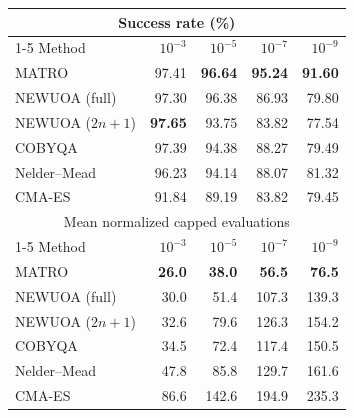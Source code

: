 \begin{tabular}{lrrrr}
\toprule
\multicolumn{5}{c}{Success rate (\%)} \\
\cmidrule(lr){1-5}
Method & $10^{-3}$ & $10^{-5}$ & $10^{-7}$ & $10^{-9}$ \\
\midrule
MATRO & 97.41 & \textbf{96.64} & \textbf{95.24} & \textbf{91.60} \\
NEWUOA (full) & 97.30 & 96.38 & 86.93 & 79.80 \\
NEWUOA ($2n+1$) & \textbf{97.65} & 93.75 & 83.82 & 77.54 \\
COBYQA & 97.39 & 94.38 & 88.27 & 79.49 \\
Nelder--Mead & 96.23 & 94.14 & 88.07 & 81.32 \\
CMA-ES & 91.84 & 89.19 & 83.82 & 79.45 \\
\midrule
\multicolumn{5}{c}{Mean normalized capped evaluations} \\
\cmidrule(lr){1-5}
Method & $10^{-3}$ & $10^{-5}$ & $10^{-7}$ & $10^{-9}$ \\
\midrule
MATRO & \textbf{26.0} & \textbf{38.0} & \textbf{56.5} & \textbf{76.5} \\
NEWUOA (full) & 30.0 & 51.4 & 107.3 & 139.3 \\
NEWUOA ($2n+1$) & 32.6 & 79.6 & 126.3 & 154.2 \\
COBYQA & 34.5 & 72.4 & 117.4 & 150.5 \\
Nelder--Mead & 47.8 & 85.8 & 129.7 & 161.6 \\
CMA-ES & 86.6 & 142.6 & 194.9 & 235.3 \\
\bottomrule
\end{tabular}
